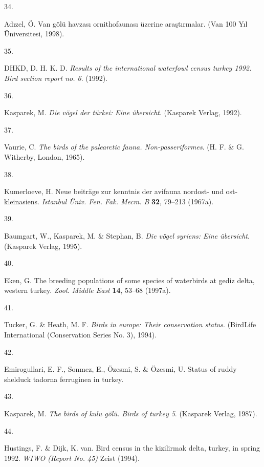 \documentclass[
  letterpaper,
  DIV=11,
  numbers=noendperiod]{scrreprt}
\newlength{\cslhangindent}
\newlength{\csllabelwidth}
\newenvironment{CSLReferences}[2] %
 {\begin{list}{}{%
  \setlength{\itemindent}{0pt}
  \setlength{\leftmargin}{0pt}
  \setlength{\parsep}{0pt}
  \ifodd #1
   \setlength{\leftmargin}{\cslhangindent}
   \setlength{\itemindent}{-1\cslhangindent}
  \fi
  \setlength{\itemsep}{#2\baselineskip}}}
 {\end{list}}
\newcommand{\CSLLeftMargin}[1]{\parbox[t]{\csllabelwidth}{\strut#1\strut}}
\newcommand{\CSLRightInline}[1]{\parbox[t]{\linewidth - \csllabelwidth}{\strut#1\strut}}
\begin{document}
\begin{CSLReferences}{0}{0}
\CSLLeftMargin{34. }%
\CSLRightInline{Adızel, Ö. Van gölü havzası ornithofaunası üzerine
araştırmalar. (Van 100 Yıl Üniversitesi, 1998).}

\CSLLeftMargin{35. }%
\CSLRightInline{DHKD, D. H. K. D. \emph{Results of the international
waterfowl census turkey 1992. Bird section report no. 6}. (1992).}

\CSLLeftMargin{36. }%
\CSLRightInline{Kasparek, M. \emph{Die vögel der türkei: Eine
übersicht}. (Kasparek Verlag, 1992).}

\CSLLeftMargin{37. }%
\CSLRightInline{Vaurie, C. \emph{The birds of the palearctic fauna.
Non-passeriformes}. (H. F. \& G. Witherby, London, 1965).}

\CSLLeftMargin{38. }%
\CSLRightInline{Kumerloeve, H. Neue beiträge zur kenntnis der avifauna
nordost- und ost-kleinasiens. \emph{Istanbul Üniv. Fen. Fak. Mecm. B}
\textbf{32}, 79--213 (1967a).}

\CSLLeftMargin{39. }%
\CSLRightInline{Baumgart, W., Kasparek, M. \& Stephan, B. \emph{Die
vögel syriens: Eine übersicht}. (Kasparek Verlag, 1995).}

\CSLLeftMargin{40. }%
\CSLRightInline{Eken, G. The breeding populations of some species of
waterbirds at gediz delta, western turkey. \emph{Zool. Middle East}
\textbf{14}, 53--68 (1997a).}

\CSLLeftMargin{41. }%
\CSLRightInline{Tucker, G. \& Heath, M. F. \emph{Birds in europe: Their
conservation status}. (BirdLife International (Conservation Series No.
3), 1994).}

\CSLLeftMargin{42. }%
\CSLRightInline{Emirogullari, E. F., Sonmez, E., Özesmi, S. \& Özesmi,
U. Status of ruddy shelduck tadorna ferruginea in turkey.}

\CSLLeftMargin{43. }%
\CSLRightInline{Kasparek, M. \emph{The birds of kulu gölü. Birds of
turkey 5}. (Kasparek Verlag, 1987).}

\CSLLeftMargin{44. }%
\CSLRightInline{Hustings, F. \& Dijk, K. van. Bird census in the
kizilirmak delta, turkey, in spring 1992. \emph{WIWO (Report No. 45)}
Zeist (1994).}


\end{CSLReferences}
\end{document}
